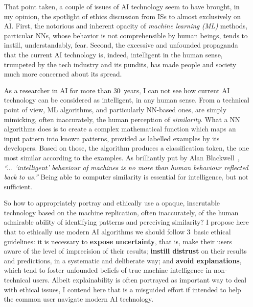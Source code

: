 \documentclass{article}
\begin{document}
That point taken, a couple of issues of AI technology seem to have brought, in my opinion, the  spotlight of ethics discussion from ISs to almost exclusively on AI. First, the notorious and inherent opacity of \emph{machine learning (ML)} methods, particular NNs, whose behavior is not comprehensible by human beings, tends to instill, understandably, fear.
Second, the excessive and unfounded propaganda that the current AI technology is, indeed, intelligent in the human sense, trumpeted by the tech industry and its pundits, has made people and society much more concerned about its spread. %

As a researcher in AI for more than 30~years, I can not see how current AI technology can be considered as intelligent, in any human sense. From a technical point of view, ML algorithms, and particularly NN-based ones, are simply mimicking, often inaccurately, the human perception of \emph{similarity}. What a NN algorithms does is to create a complex mathematical function which maps an input pattern into known patterns, provided as labelled examples by its developers. Based on those, the algorithm produces a classification token, the one most similar according to the examples. As brilliantly put by Alan Blackwell~\cite{blackwell2019objective}, \emph{``... ‘intelligent’ behaviour of machines is no more than human behaviour reflected back to us.''} Being able to computer similarity is essential for intelligence, but not sufficient.



So how to appropriately portray and ethically use a opaque, inscrutable technology based on the machine replication, often inaccurately, of the human admirable ability of identifying patterns and perceiving similarity? %
I propose here that to ethically use modern AI algorithms we should follow 3~basic ethical guidelines: %
it is necessary to \textbf{expose uncertainty}, that is, make their users aware of the level of imprecision of their results; \textbf{instill distrust} on their results and predictions, in a systematic and deliberate way; and \textbf{avoid explanations}, which tend to foster unfounded beliefs of true machine intelligence in non-technical users. Albeit explainability is often portrayed as important way to deal with ethical issues, I contend here that is a misguided effort if intended to help the common user navigate modern AI technology.
\end{document}
